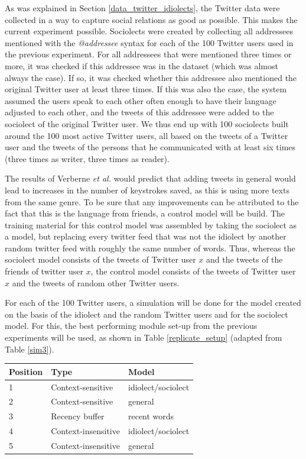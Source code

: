 \documentclass[11pt]{article}
\let\originaltable\table
\let\endoriginaltable\endtable
\renewenvironment{table}[1][ht]{%
  \originaltable[#1]
  \centering}%
  {\endoriginaltable}
\begin{document}
As was explained in Section \ref{data_twitter_idiolects}, the Twitter data were collected in a way to capture social relations as good as possible. This makes the current experiment possible. Sociolects were created by collecting all addressees mentioned with the \emph{@addressee} syntax for each of the 100 Twitter users used in the previous experiment. For all addressees that were mentioned three times or more, it was checked if this addressee was in the dataset (which was almost always the case). If so, it was checked whether this addressee also mentioned the original Twitter user at least three times. If this was also the case, the system assumed the users speak to each other often enough to have their language adjusted to each other, and the tweets of this addressee were added to the sociolect of the original Twitter user. We thus end up with 100 sociolects built around the 100 most active Twitter users, all based on the tweets of a Twitter user and the tweets of the persons that he communicated with at least six times (three times as writer, three times as reader).

The results of Verberne {\em et al.}  would predict that adding tweets in general would lead to increases in the number of keystrokes saved, as this is using more texts from the same genre. To be sure that any improvements can be attributed to the fact that this is the language from friends, a control model will be build. The training material for this control model was assembled by taking the sociolect as a model, but replacing every twitter feed that was not the idiolect by another random twitter feed with roughly the same number of words. Thus, whereas the sociolect model consists of the tweets of Twitter user $x$ and the tweets of the friends of twitter user $x$, the control model consists of the tweets of Twitter user $x$ and the tweets of random other Twitter users.

For each of the 100 Twitter users, a simulation will be done for the model created on the basis of the idiolect and the random Twitter users and for the sociolect model. For this, the best performing module set-up from the previous experiments will be used, as shown in Table \ref{replicate_setup} (adapted from Table \ref{sim3}).

\begin{table}[H]
\begin{tabular}{lll} 
Position&Type&Model\\
\hline
1&Context-sensitive&idiolect/sociolect\\
2&Context-sensitive&general\\
3&Recency buffer&recent words\\
4&Context-insensitive&idiolect/sociolect\\
5&Context-insensitive&general\\
\end{tabular} 
\caption{The best performing module set-up} \label{replicate_setup}
\end{table}
\end{document}
